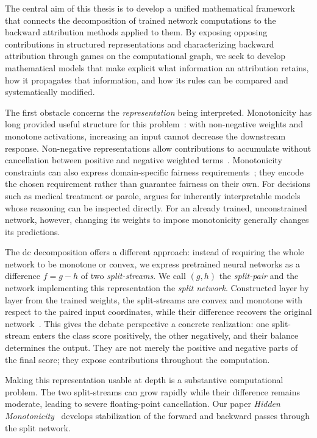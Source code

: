 The central aim of this thesis is to develop a unified mathematical framework that connects the decomposition of trained network computations to the backward attribution methods applied to them. By exposing opposing contributions in structured representations and characterizing backward attribution through games on the computational graph, we seek to develop mathematical models that make explicit what information an attribution retains, how it propagates that information, and how its rules can be compared and systematically modified.

The first obstacle concerns the \emph{representation} being interpreted. Monotonicity has long provided useful structure for this problem~\parencite{Sill1997_MonotonicNetworks,Amos2017}: with non-negative weights and monotone activations, increasing an input cannot decrease the downstream response. Non-negative representations allow contributions to accumulate without cancellation between positive and negative weighted terms~\parencite{ayinde2018nonnegativity,lee1999nmf}. Monotonicity constraints can also express domain-specific fairness requirements~\parencite{Wang2020ShapeFairness}; they encode the chosen requirement rather than guarantee fairness on their own. For decisions such as medical treatment or parole, \textcite{rudin2019stop} argues for inherently interpretable models whose reasoning can be inspected directly. For an already trained, unconstrained network, however, changing its weights to impose monotonicity generally changes its predictions.

The \ac{dc} decomposition offers a different approach: instead of requiring the whole network to be monotone or convex, we express pretrained neural networks as a difference $f=g-h$ of two \emph{split-streams}. We call $(g,h)$ the \emph{split-pair} and the network implementing this representation the \emph{split network}. Constructed layer by layer from the trained weights, the split-streams are convex and monotone with respect to the paired input coordinates, while their difference recovers the original network~\parencite{hiddenMono}. This gives the debate perspective a concrete realization: one split-stream enters the class score positively, the other negatively, and their balance determines the output. They are not merely the positive and negative parts of the final score; they expose contributions throughout the computation.

Making this representation usable at depth is a substantive computational problem. The two split-streams can grow rapidly while their difference remains moderate, leading to severe floating-point cancellation. Our paper \emph{Hidden Monotonicity}~\parencite{hiddenMono} develops stabilization of the forward and backward passes through the split network.

